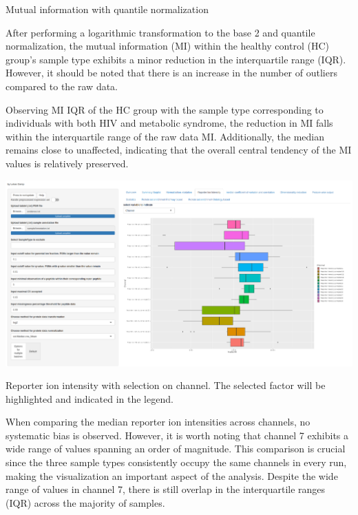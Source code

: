 \documentclass[
  11pt,
]{article}
\let\origfigure\figure
\begin{document}
\caption{Mutual information with quantile normalization}\label{fig:ui_mutual_info_quant_norm}
 \endfigure\egroup

After performing a logarithmic transformation to the base 2 and quantile
normalization, the mutual information (MI) within the healthy control
(HC) group's sample type exhibits a minor reduction in the interquartile
range (IQR). However, it should be noted that there is an increase in
the number of outliers compared to the raw data.

Observing MI IQR of the HC group with the sample type corresponding to
individuals with both HIV and metabolic syndrome, the reduction in MI
falls within the interquartile range of the raw data MI. Additionally,
the median remains close to unaffected, indicating that the overall
central tendency of the MI values is relatively preserved.

\newpage
\bgroup  \origfigure[H] 

{\centering \includegraphics[width=1\linewidth]{screenshots/RI_channel_default} 

}

\caption{Reporter ion intensity with selection on channel. The selected factor will be highlighted and indicated in the legend.}\label{fig:ui_RI_channel_default}
 \endfigure\egroup

When comparing the median reporter ion intensities across channels, no
systematic bias is observed. However, it is worth noting that channel 7
exhibits a wide range of values spanning an order of magnitude. This
comparison is crucial since the three sample types consistently occupy
the same channels in every run, making the visualization an important
aspect of the analysis. Despite the wide range of values in channel 7,
there is still overlap in the interquartile ranges (IQR) across the
majority of samples.
\end{document}
